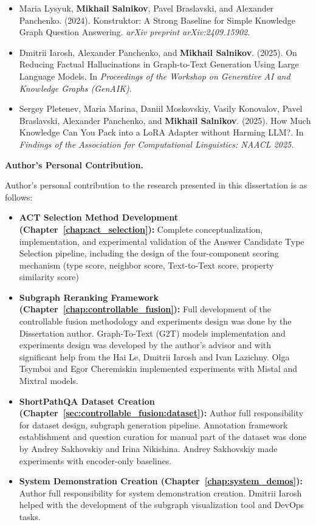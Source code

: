 \begin{itemize}
    \item Maria Lysyuk, \textbf{Mikhail Salnikov}, Pavel Braslavski, and Alexander Panchenko. (2024). Konstruktor: A Strong Baseline for Simple Knowledge Graph Question Answering. \textit{arXiv preprint arXiv:2409.15902}.
    \item Dmitrii Iarosh, Alexander Panchenko, and \textbf{Mikhail Salnikov}. (2025). On Reducing Factual Hallucinations in Graph-to-Text Generation Using Large Language Models. In \textit{Proceedings of the Workshop on Generative AI and Knowledge Graphs (GenAIK)}.
    \item Sergey Pletenev, Maria Marina, Daniil Moskovskiy, Vasily Konovalov, Pavel Braslavski, Alexander Panchenko, and \textbf{Mikhail Salnikov}. (2025). How Much Knowledge Can You Pack into a LoRA Adapter without Harming LLM?. In \textit{Findings of the Association for Computational Linguistics: NAACL 2025}.
\end{itemize}

\textbf{Author's Personal Contribution.}

Author's personal contribution to the research presented in this dissertation is as follows:
\begin{itemize}
    \item \textbf{ACT Selection Method Development (Chapter~\ref{chap:act_selection}):} Complete conceptualization, implementation, and experimental validation of the Answer Candidate Type Selection pipeline, including the design of the four-component scoring mechanism (type score, neighbor score, Text-to-Text score, property similarity score)
    \item \textbf{Subgraph Reranking Framework (Chapter~\ref{chap:controllable_fusion}):} Full development of the controllable fusion methodology and experiments design was done by the Dissertation author. Graph-To-Text (G2T) models implementation and experiments design was developed by the author's advisor and with significant help from the Hai Le, Dmitrii Iarosh and Ivan Lazichny. Olga Tsymboi and Egor Cheremiskin implemented experiments with Mistal and Mixtral models. 
    \item \textbf{ShortPathQA Dataset Creation (Chapter~\ref{sec:controllable_fusion:dataset}):} Author full responsibility for dataset design, subgraph generation pipeline. Annotation framework establishment and question curation for manual part of the dataset was done by Andrey Sakhovskiy and Irina Nikishina. Andrey Sakhovskiy made experiments with encoder-only baselines.
    \item \textbf{System Demonstration Creation (Chapter~\ref{chap:system_demos}):} Author full responsibility for system demonstration creation. Dmitrii Iarosh helped with the development of the subgraph visualization tool and DevOps tasks.
\end{itemize}

